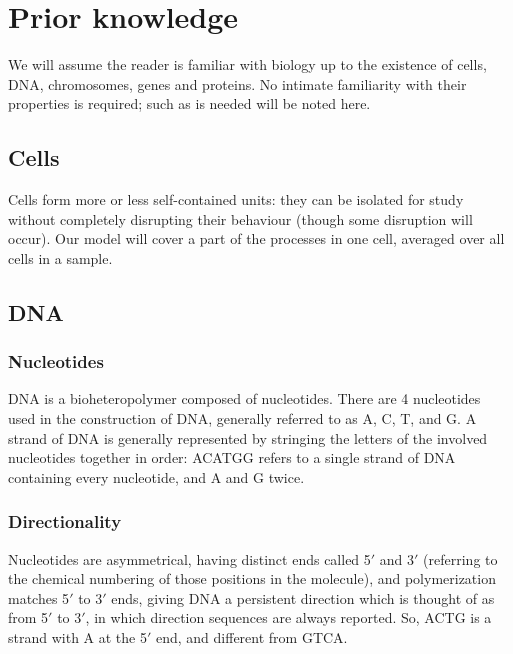\documentclass[fleqn]{book}
\begin{document}
\section{Prior knowledge}\label{prior-knowledge}

We will assume the reader is familiar with biology up to the existence
of cells, DNA, chromosomes, genes and proteins. No intimate familiarity
with their properties is required; such as is needed will be noted here.

\subsection{Cells}\label{cells}

Cells form more or less self-contained units: they can be isolated for
study without completely disrupting their behaviour (though some
disruption will occur). Our model will cover a part of the processes in
one cell, averaged over all cells in a sample.

\subsection{DNA}\label{dna}

\subsubsection{Nucleotides}\label{nucleotides}

DNA is a bioheteropolymer composed of nucleotides. There are 4
nucleotides used in the construction of DNA, generally referred to as A,
C, T, and G. A strand of DNA is generally represented by stringing the
letters of the involved nucleotides together in order: ACATGG refers to
a single strand of DNA containing every nucleotide, and A and G twice.

\subsubsection{Directionality}\label{directionality}

Nucleotides are asymmetrical, having distinct ends called 5\('\) and
3\('\) (referring to the chemical numbering of those positions in the
molecule), and polymerization matches 5\('\) to 3\('\) ends, giving DNA
a persistent direction which is thought of as from 5\('\) to 3\('\), in
which direction sequences are always reported. So, ACTG is a strand with
A at the 5\('\) end, and different from GTCA.
\end{document}
